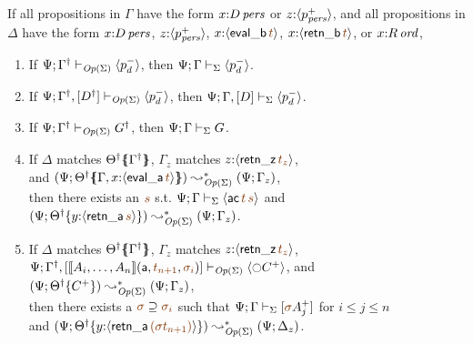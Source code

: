 \bigskip
\begin{theorem}\label{thm:opersound}
If all propositions in $\Gamma$ have the form 
$x{:}{D}\,{{\it pers}}$ or $z{:}\langle {p^+_{{\it pers}}} \rangle$, and all propositions in 
$\Delta$ have the form $x{:}{D}\,{{\it pers}}$, $z{:}\langle {p^+_{{\it pers}}} \rangle$,
$x{:}\susp{{\sf eval\_b}\,\lf{t}}$, $x{:}\susp{{\sf retn\_b}\,\lf{t}}$, or
$x{:}{R}\,{{\it ord}}$, 
\begin{enumerate}
\item If ${\Psi}; {{{\Gamma}^\dag}} \vdash_{{\it Op}({\Sigma})} {\langle {p^-_d} \rangle}$,
then ${\Psi}; {\Gamma} \vdash_{\Sigma} {\langle {p^-_d} \rangle}$.
\item If ${\Psi}; {{{\Gamma}^\dag}, [{{D}^\dag}]} \vdash_{{\it Op}({\Sigma})} {\langle {p^-_d} \rangle}$, then ${\Psi}; {\Gamma, [D]} \vdash_{\Sigma} {\langle {p^-_d} \rangle}$.
\item If ${\Psi}; {{{\Gamma}^\dag}} \vdash_{{\it Op}({\Sigma})} {{{G}^\dag}}$, then
 ${\Psi}; {\Gamma} \vdash_{\Sigma} {G}$.
\item If $\Delta$ matches ${{{\Theta}^\dag}}\mbox{$\{\hspace{-4pt}\{$}{{{\Gamma}^\dag}}\mbox{$\}\hspace{-4pt}\}$}$,
$\Gamma_z$ matches $z{:}\susp{{\sf retn\_z}\,\lf{t_z}}$, \\
and
$(\Psi; \frameoff{\opsubst{\Theta}}{\mkconj{\Gamma}{x{:}\susp{{\sf eval\_a}\,\lf{t}}}}) \leadsto^*_{\transop{\Sigma}} (\Psi; \Gamma_z)$, \\
then there exists an $\lf{s}$ s.t.
$\slss{\Sigma}{\Psi}{\Gamma}{\susp{{\sf ac}\,\lf{t}\,\lf{s}}}$ and
$(\Psi; \tackon{\opsubst{\Theta}}{y{:}\susp{{\sf retn\_a}\,\lf{s}}}) 
   \leadsto^*_{\transop{\Sigma}}
 (\Psi; \Gamma_z)$.
\item If $\Delta$ matches ${{{\Theta}^\dag}}\mbox{$\{\hspace{-4pt}\{$}{{{\Gamma}^\dag}}\mbox{$\}\hspace{-4pt}\}$}$,
$\Gamma_z$ matches $z{:}\susp{{\sf retn\_z}\,\lf{t_z}}$, \\
$\slss{\transop{\Sigma}}{\Psi}{\opsubst{\Gamma}, [\opbasic{A_i,\ldots,A_n}{t_{n+1}}{\sigma_i}]}{\susp{{\ocircle}C^+}}{}$, and 
$(\Psi; {{{\Theta}^\dag}}\{{C^+}\})
         \leadsto^*_{{\it Op}({\Sigma})}
       (\Psi; \Gamma_z)$, \\
then there exists a $\lf{\sigma} \supseteq \lf{\sigma_i}$ such that 
$\slss{\Sigma}{\Psi}{\Gamma}{[\lf{\sigma}A^+_j]}$ for $i \leq j \leq n$\\
and 
$(\Psi; \tackon{\opsubst{\Theta}}{y{:}\susp{{\sf retn\_a}\,\lf{(\lf{\sigma t_{n+1}})}}})
  \leadsto^*_{\transop{\Sigma}}
 (\Psi; \Delta_z)$. 
\end{enumerate}
\end{theorem}

